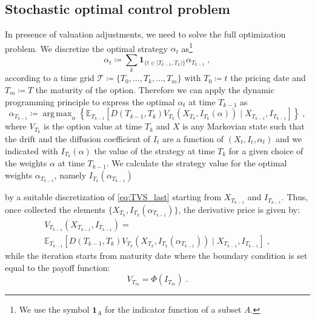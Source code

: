 \documentclass[runningheads]{m2ef}
\DeclareMathOperator*{\argmax}{arg\,max}
\newcommand\soutpars[1]{\let\helpcmd\sout\parhelp#1\par\relax\relax}
\newcommand{\change}[1]{{\color{red} {#1}}}%
\newcommand{\remove}[1]{{\color{red} \soutpars{{#1}}}}%
\begin{document}
\subsection{Stochastic \change{o}ptimal \change{c}ontrol \change{p}roblem}
In presence of valuation adjustments, we need to solve the full optimization problem. We discretize the optimal strategy $\alpha_t$ as\footnote{We use the symbol $\mathbf{1}_A$ for the indicator function of a subset $A$.}
\begin{equation}
    \alpha_t \coloneqq \sum_k \mathbf{1}_{ \{t \in [T_{k-1}, T_k)\}}\alpha_{T_{k-1}} \; ,
\label{eq:piecewise_strategy}\end{equation}
according to a time grid $\mathcal{T}\coloneqq \{T_0,...,T_k,...,T_m\}$ with $T_0\coloneqq t$ the pricing date and $T_m \coloneqq T$ the maturity of the option. 
Therefore we can apply the dynamic programming principle to express the optimal $\alpha_t$ at time $T_{k-1}$ as
\begin{equation}
    \alpha_{T_{k-1}}\coloneqq \argmax_{\alpha} \left\{\mathbb{E}_{T_{k-1}}\left[D\left(T_{k-1},T_{k} \right) V_{T_{k}}\left(X_{T_{k}}, I_{T_{k}}(\alpha)\right) \mid X_{T_{k-1}}, I_{T_{k-1}}\right]\right\} \; ,
\label{eq:recursion}\end{equation}
where $V_{T_k}$ is the option value at time $T_k$ and $X$ is any Markovian state such that the drift and the diffusion coefficient of $I_t$ are a function of $\left(X_t,I_t,\alpha_t\right)$ \change{and we indicated with $I_{T_k}\left(\alpha\right)$ the value of the strategy at time $T_{k}$ for a given choice of the weights $\alpha$ at time $T_{k-1}$.} We calculate \change{the strategy value for the optimal weights $\alpha_{T_{k-1}}$, namely} $I_{T_k}\left(\alpha_{T_{k-1}}\right)$ \remove{for any given strategy $\alpha_{T_{k-1}}$} by a suitable discretization of \eqref{eq:TVS_last} starting from $X_{T_{k-1}}$ and $I_{T_{k-1}}$.
\change{Thus, once collected the elements $\{X_{T_{k}}, I_{T_{k}}\left(\alpha_{T_{k-1}}\right)\}$,} the derivative price is given by:
\begin{equation}
\begin{aligned}
	    V_{T_{k-1}}\left(X_{T_{k-1}}, I_{T_{k-1}}\right)= \\ 
	     \mathbb{E}_{T_{k-1}}\left[D\left(T_{k-1},T_{k}\right) V_{T_{k}}\left(X_{T_{k}}, I_{T_{k}}\left(\alpha_{T_{k-1}}\right)\right) \mid X_{T_{k-1}}, I_{T_{k-1}}\right] \; ,
\end{aligned}
\label{eq:recursion2}\end{equation}
while the iteration starts from maturity date where the boundary condition is set equal to the payoff function:
\begin{equation}
    V_{T_m} = \Phi\left(I_{T_m}\right) \; .
\end{equation}
\end{document}
